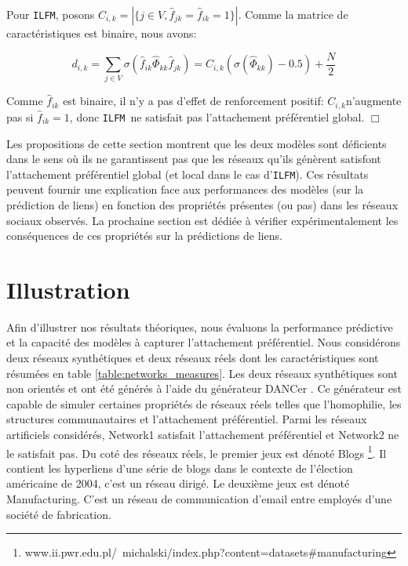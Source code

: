 \documentclass[french]{hermes-journal}
\newcommand{\ilfm}{\texttt{ILFM}}
\begin{document}
Pour \ilfm, posons $C_{i,k} = |\{j \in V, \hat{f}_{jk} = \hat{f}_{ik} = 1\}|$. Comme la matrice de caractéristiques est binaire, nous avons: 

\[ 
d_{i,k} = \sum_{j\in V} \sigma(\hat{f}_{ik} \hat{\Phi}_{kk} \hat{f}_{jk}) =  C_{i,k} (\sigma(\hat{\Phi}_{kk})-0.5) + \frac{N}{2}
\]

Comme $\hat{f}_{ik}$  est binaire, il n'y a pas d'effet de  renforcement positif: $C_{i,k}$n'augmente pas si $\hat{f}_{ik}=1$, donc \ilfm\ ne satisfait  pas l'attachement préférentiel global. \hspace{4.69cm} $\Box$

Les propositions de cette section montrent que les deux modèles sont déficients dans le sens où ils ne garantissent pas que les réseaux qu'ils génèrent satisfont l'attachement préférentiel global (et local dans le cas d'\ilfm). Ces résultats peuvent fournir une explication face aux performances des modèles (sur la prédiction de liens) en fonction des propriétés présentes (ou pas) dans les réseaux sociaux observés. 
La prochaine section est dédiée à vérifier expérimentalement les conséquences de ces propriétés sur la prédictions de liens.

\section{Illustration}
\label{sec:exps}

Afin d'illustrer nos résultats théoriques, nous évaluons la performance prédictive et la capacité des modèles à capturer l'attachement préférentiel. Nous considérons deux réseaux synthétiques et deux réseaux réels dont les caractéristiques sont résumées en table \ref{table:networks_measures}. Les deux réseaux synthétiques sont non orientés et ont été générés à l'aide du générateur DANCer \cite{largeron2015}. Ce générateur est capable de  simuler certaines propriétés de réseaux réels telles que l'homophilie, les structures communautaires et l'attachement préférentiel. Parmi les réseaux artificiels considérés, Network1 satisfait l'attachement préférentiel et Network2 ne le satisfait pas. Du coté des réseaux réels, le premier jeux est dénoté Blogs \footnote{www.ii.pwr.edu.pl/~michalski/index.php?content=datasets\#manufacturing}. Il contient les hyperliens d'une série de blogs dans le contexte de l'élection américaine de 2004, c'est un réseau dirigé. Le deuxième jeux est dénoté Manufacturing. C'est un réseau de communication d'email entre employés d'une société de fabrication. 
\end{document}
